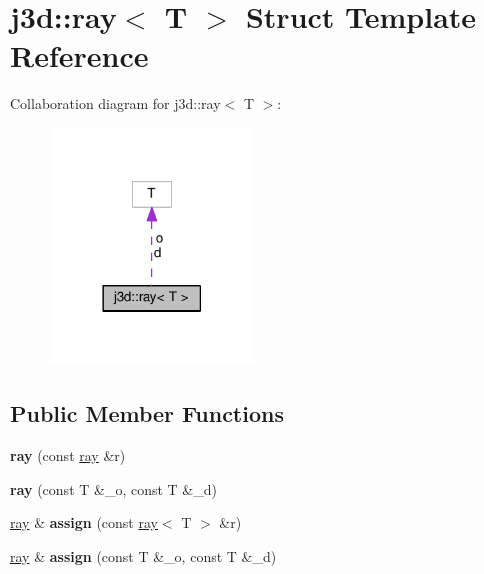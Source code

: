 \hypertarget{structj3d_1_1ray}{}\section{j3d\+:\+:ray$<$ T $>$ Struct Template Reference}
\label{structj3d_1_1ray}


Collaboration diagram for j3d\+:\+:ray$<$ T $>$\+:
\nopagebreak
\begin{figure}[H]
\begin{center}
\leavevmode
\includegraphics[width=153pt]{structj3d_1_1ray__coll__graph}
\end{center}
\end{figure}
\subsection*{Public Member Functions}
\begin{DoxyCompactItemize}
\item 
\hypertarget{structj3d_1_1ray_a555276083aafd278de35d4a0620acdf7}{}{\bfseries ray} (const \hyperlink{structj3d_1_1ray}{ray} \&r)\label{structj3d_1_1ray_a555276083aafd278de35d4a0620acdf7}

\item 
\hypertarget{structj3d_1_1ray_aac9d526d9bc60813f4af179d8c515c6b}{}{\bfseries ray} (const T \&\+\_\+o, const T \&\+\_\+d)\label{structj3d_1_1ray_aac9d526d9bc60813f4af179d8c515c6b}

\item 
\hypertarget{structj3d_1_1ray_a31c660ce6b0f90fa12ecc7d0ec55b31f}{}\hyperlink{structj3d_1_1ray}{ray} \& {\bfseries assign} (const \hyperlink{structj3d_1_1ray}{ray}$<$ T $>$ \&r)\label{structj3d_1_1ray_a31c660ce6b0f90fa12ecc7d0ec55b31f}

\item 
\hypertarget{structj3d_1_1ray_a18c4a5d94aa38283e1a636a71014c66c}{}\hyperlink{structj3d_1_1ray}{ray} \& {\bfseries assign} (const T \&\+\_\+o, const T \&\+\_\+d)\label{structj3d_1_1ray_a18c4a5d94aa38283e1a636a71014c66c}

\end{DoxyCompactItemize}
